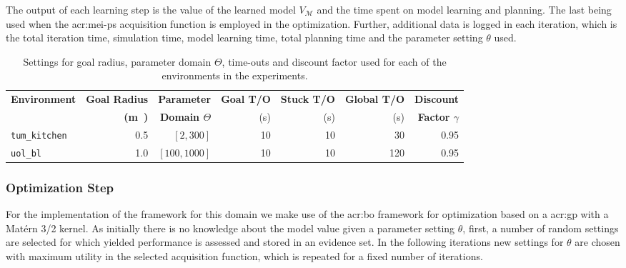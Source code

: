 The output of each learning step is the value of the learned model $V_\mathcal{M}$ and the time spent on model learning and planning.
The last being used when the \acrshort{acr:mei-ps} acquisition function is employed in the optimization.
Further, additional data is logged in each iteration, which is the total iteration time, simulation time, model learning time, total planning time and the parameter setting $\theta$ used.


\begin{table}
	\caption{Settings for goal radius, parameter domain $\Theta$, time-outs and discount factor used for each of the environments in the experiments.}
	\label{tab:designer-settings}\centering
	\begin{tabular}{|l|r|r|r|r|r|r|}
		\hline
		\textbf{Environment} & \textbf{Goal Radius} & \textbf{Parameter} & \textbf{Goal T/O} & \textbf{Stuck T/O} & \textbf{Global T/O} & \textbf{Discount}  \\
		
		& \textbf{(\si\meter)} & \textbf{Domain $\Theta$} & (\si{\second}) & (\si{\second}) & (\si{\second}) & \textbf{Factor $\gamma$}\\
		\hline
		\texttt{tum\_kitchen} & \num{0.5} & $[2, 300]$ & \num{10} & \num{10} & \num{30} & \num{0.95} \\
		\hline
		\texttt{uol\_bl} & \num{1.0} & $[100, 1000]$ & \num{10} & \num{10} & \num{120} & \num{0.95}\\
		\hline
	\end{tabular}
\end{table}

\subsubsection{Optimization Step}

For the implementation of the framework for this domain we make use of the \acrshort{acr:bo} framework for optimization based on a \acrshort{acr:gp} with a Mat\'ern 3/2 kernel.
As initially there is no knowledge about the model value given a parameter setting $\theta$, first, a number of random settings are selected for which yielded performance is assessed and stored in an evidence set.
In the following iterations new settings for $\theta$ are chosen with maximum utility in the selected acquisition function, which is repeated for a fixed number of iterations.

